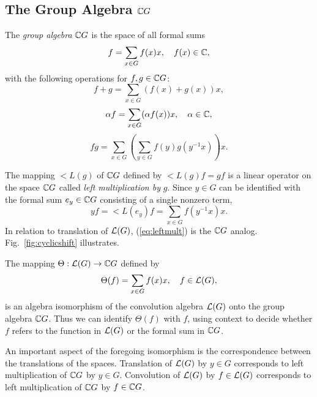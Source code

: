 
\subsection{The Group Algebra $\mathbb{C} G$}
\label{sec:groupalgebra}
The \emph{group algebra} $\mathbb{C} G$ is the space of all formal sums
\begin{equation}
f = \sum_{x\in G} f(x) x, \quad f(x) \in \mathbb{C},
\end{equation}
with the following operations for $f, g \in \mathbb{C} G$:
\begin{equation}
f+g = \sum_{x\in G} (f(x) + g(x))x,
\end{equation}
\begin{equation}
\alpha f = \sum_{x\in G} (\alpha f(x)) x, 
           \quad \alpha \in \mathbb{C},
\end{equation}
\begin{equation}
fg = \sum_{x\in G}\left(\sum_{y\in G} f(y)g(y^{-1}x)\right)x. 
\end{equation}

The mapping $\lt{L}(g)$ of $\mathbb{C} G$ defined by 
$\lt{L}(g)f = gf$
is a linear operator on the space $\mathbb{C} G$ called 
\emph{left multiplication by} $g$.  
Since $y\in G$ can be identified with the formal
sum $e_y \in \mathbb{C} G$ consisting of a single nonzero term,
\begin{equation}\label{eq:leftmult}
yf = \lt{L}(e_y)f = \sum_{x\in G}f(y^{-1}x) x.
\end{equation}
In relation to translation of $\mathcal{L}(G)$, (\ref{eq:leftmult}) is the
$\mathbb{C} G$ analog. Fig.~\ref{fig:cyclicshift} illustrates.

The mapping $\Theta: \mathcal{L}(G) \to \mathbb{C} G$ defined by
\begin{equation}\label{eq:iso}
\Theta(f) = \sum_{x\in G} f(x) x, \quad f\in \mathcal{L}(G),
\end{equation}
is an algebra isomorphism of the convolution algebra $\mathcal{L}(G)$
onto the group algebra $\mathbb{C} G$.  
Thus we can identify
$\Theta(f)$ with $f$, using  context to decide whether
$f$ refers to the function in $\mathcal{L}(G)$ or the formal sum in
$\mathbb{C} G$.  

An important aspect of the foregoing isomorphism is the
correspondence between the translations of the spaces.
Translation of $\mathcal{L}(G)$ by $y\in G$ %
corresponds to left multiplication of $\mathbb{C} G$ by $y\in G$.
Convolution of $\mathcal{L}(G)$ by $f\in \mathcal{L}(G)$ corresponds to
left multiplication of $\mathbb{C} G$ by $f\in \mathbb{C} G$. 

